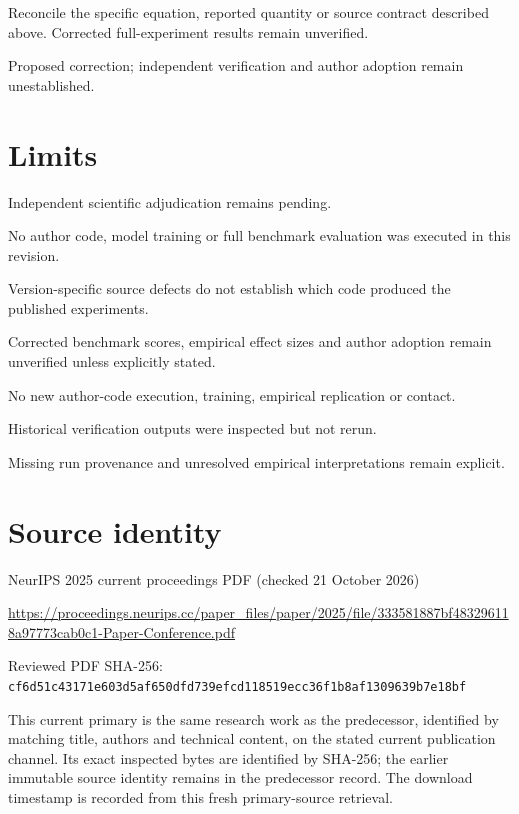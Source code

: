 \documentclass[11pt]{article}
\begin{document}
Reconcile the specific equation, reported quantity or source contract described above. Corrected full-experiment results remain unverified.

Proposed correction; independent verification and author adoption remain unestablished.

\section*{Limits}

Independent scientific adjudication remains pending.\par

No author code, model training or full benchmark evaluation was executed in this revision.\par

Version-specific source defects do not establish which code produced the published experiments.\par

Corrected benchmark scores, empirical effect sizes and author adoption remain unverified unless explicitly stated.\par

No new author-code execution, training, empirical replication or contact.\par

Historical verification outputs were inspected but not rerun.\par

Missing run provenance and unresolved empirical interpretations remain explicit.\par

\section*{Source identity}

NeurIPS 2025 current proceedings PDF (checked 21 October 2026)

\url{https://proceedings.neurips.cc/paper_files/paper/2025/file/333581887bf483296118a97773cab0c1-Paper-Conference.pdf}

Reviewed PDF SHA-256: \nolinkurl{cf6d51c43171e603d5af650dfd739efcd118519ecc36f1b8af1309639b7e18bf}

This current primary is the same research work as the predecessor, identified by matching title, authors and technical content, on the stated current publication channel. Its exact inspected bytes are identified by SHA-256; the earlier immutable source identity remains in the predecessor record. The download timestamp is recorded from this fresh primary-source retrieval.
\end{document}
